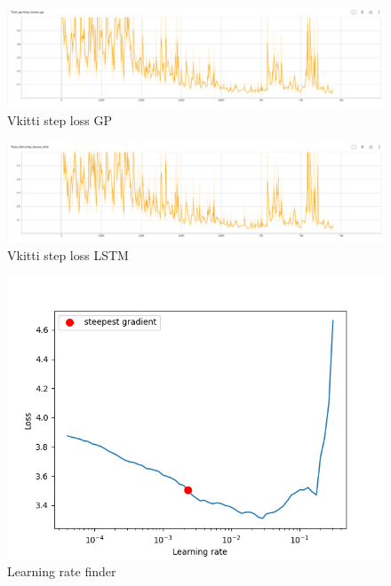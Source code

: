 	\begin{figure}
		\centering
		\includegraphics[width=13cm]{images/gp_step_loss_vkitti.png}
		\caption{Vkitti step loss GP}
		\label{fig:android_result}
	\end{figure}

	\begin{figure}
		\centering
		\includegraphics[width=13cm]{images/lstm_step_loss_vkitti.png}
		\caption{Vkitti step loss LSTM}
		\label{fig:android_result}
	\end{figure}

	\begin{figure}
		\centering
		\includegraphics[width=13cm]{images/lr_finder_41.png}
		\caption{Learning rate finder}
		\label{fig:android_result}
	\end{figure}



